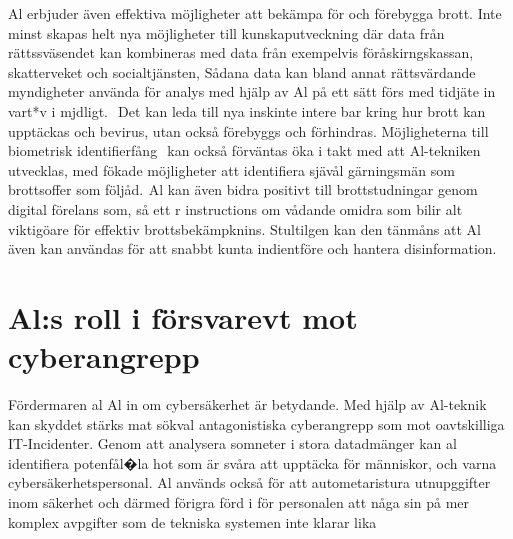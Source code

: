 {{{{{{{{Al erbjuder även effektiva möjligheter att bekämpa för och förebygga brott. Inte minst skapas helt nya möjligheter till kunskaputveckning där data från rättssväsendet kan kombineras med data från exempelvis föråskirngskassan, skatterveket och socialtjänsten, Sådana data kan bland annat rättsvärdande myndigheter använda för analys med hjälp av Al på ett sätt förs med tidjäte in vart*v i mjdligt. \({ }^{}\) Det kan leda till nya inskinte intere bar kring hur brott kan upptäckas och bevirus, utan också förebyggs och förhindras. Möjligheterna till biometrisk identifierfång \({ }^{}\) kan också förväntas öka i takt med att Al-tekniken utvecklas, med fökade möjligheter att identifiera sjävål gärningsmän som brottsoffer som följåd. \({ }^{} \mathrm{Al}\) kan även bidra positivt till brottstudningar genom digital förelans som, så ett r instructions om vådande omidra som bilir alt viktigöare för effektiv brottsbekämpknins. Stultilgen kan den tänmåns att Al även kan användas för att snabbt kunta indientföre och hantera disinformation.
\section*{Al:s roll i försvarevt mot cyberangrepp}
Fördermaren al Al in om cybersäkerhet är betydande. Med hjälp av Al-teknik kan skyddet stärks mat sökval antagonistiska cyberangrepp som mot oavtskilliga IT-Incidenter. Genom att analysera somneter i stora datadmänger kan al identifiera potenfål�la hot som är svåra att upptäcka för människor, och varna cybersäkerhetspersonal. Al används också för att autometaristura utnupggifter inom säkerhet och därmed förigra förd i för personalen att någa sin på mer komplex avpgifter som de tekniska systemen inte klarar lika

}}}}}}}}
